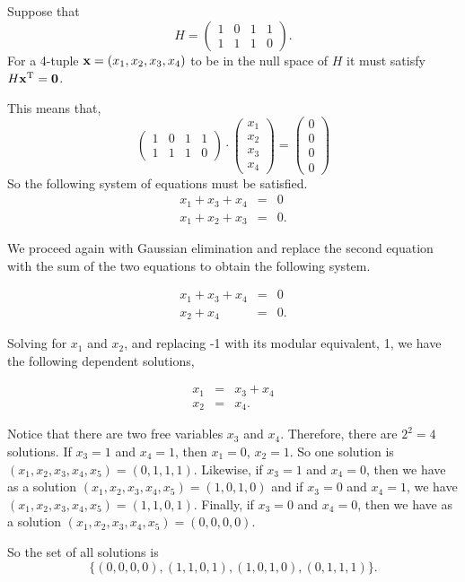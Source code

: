 \begin{example}{}
Suppose that
\[
H =
\left(
\begin{array}{cccc}
1 & 0 & 1 & 1 \\
1 & 1 & 1 &  0 
\end{array}
\right).
\]
For a 4-tuple ${\bold x} = (x_1, x_2, x_3, x_4)$ to be in
the null space of $H$ it must satisfy $H{\bold x}^\textrm{T} = {\bold 0}$. 

This means that,
\[
\left(
\begin{array}{cccc}
1 & 0 & 1 & 1 \\
1 & 1 & 1 &  0
\end{array}
\right)\cdot
\left(
\begin{array}{c}
x_1 \\
x_2\\
x_3\\
x_4
\end{array}
\right)
=
\left(
\begin{array}{c}
0\\
0\\
0\\
0
\end{array}
\right)
\]
So the following system of equations must be satisfied. 
\begin{eqnarray*}
 x_1 + x_3 + x_4   & = & 0 \\
x_1 + x_2 + x_3   & = & 0.
\end{eqnarray*}


We proceed again with Gaussian elimination and  replace the second equation with the sum of the two equations to obtain the following system.

\begin{eqnarray*}
 x_1 + x_3 + x_4   & = & 0 \\
 x_2 + x_4 & = & 0.
\end{eqnarray*}

Solving for $x_1$ and $x_2$, and replacing {-1} with its modular equivalent, {1}, we have the following dependent solutions,

\begin{eqnarray*}
  x_1 &=&  x_3  +  x_4  \\
 x_2 &=&  x_4 .
\end{eqnarray*}
 
Notice that there are two free variables $x_3$ and $x_4$. Therefore, there are $2^2=4$ solutions. If $x_3=1$ and $x_4=1$, then $x_1=0$, $x_2=1$. So one solution is $(x_1,x_2,x_3,x_4,x_5) = (0,1,1,1)$.
Likewise, if $x_3=1$ and $x_4=0$, then we have as a solution $(x_1,x_2,x_3,x_4,x_5) = (1,0,1,0)$
and if $x_3=0$ and $x_4=1$, we have $(x_1,x_2,x_3,x_4,x_5) = (1,1,0,1)$.
Finally, if $x_3=0$ and $x_4=0$, then we have as a solution $(x_1,x_2,x_3,x_4,x_5) = (0,0,0,0)$.

So the  set of all solutions is
\[
\{(0,0,0,0),(1,1,0,1), (1,0,1,0), (0,1,1,1)\}.
\]
\end{example}

